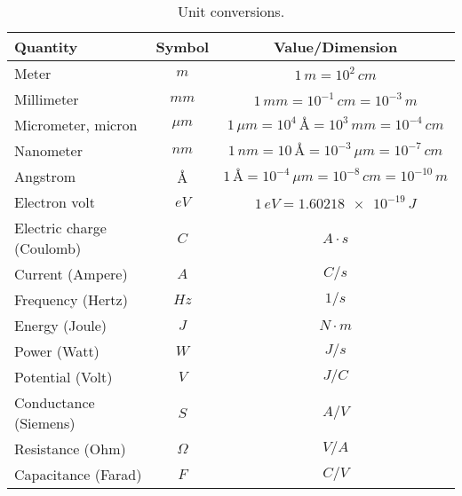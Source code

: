     \begin{table}[H]
        \centering
        \setlength{\tabcolsep}{20pt}
        \renewcommand{\arraystretch}{1.5}
        \begin{tabular}{|l|c|c|}
            \hline
            \textbf{Quantity}  &  \textbf{Symbol} & \textbf{Value/Dimension}\\
            \hline
            Meter & $m$ & $1\,m = 10^2\,cm$\\
            \hline
            Millimeter & $mm$ & $1\,mm = 10^{-1}\,cm = 10^{-3}\,m$\\
            \hline
            Micrometer, micron & $\mu m$ & $1\,\mu m = 10^4\,\text{\AA} = 10^3\,mm = 10^{-4}\,cm$\\
            \hline
            Nanometer & $nm$ & $1\,nm = 10\,\text{\AA} = 10^{-3}\,\mu m = 10^{-7}\,cm$\\
            \hline
            Angstrom & $\text{\AA}$ & $1\,\text{\AA} = 10^{-4}\,\mu m = 10^{-8}\,cm = 10^{-10}\,m$\\
            \hline
            Electron volt & $eV$ & $1\,eV = \num{1.60218e-19}\,J$\\
            \hline
            Electric charge (Coulomb) & $C$ & $A \cdot s$\\
            \hline
            Current (Ampere) & $A$ & $C/s$\\
            \hline
            Frequency (Hertz) & $Hz$ & $1/s$\\
            \hline
            Energy (Joule) & $J$ & $N \cdot m$\\
            \hline
            Power (Watt) & $W$ & $J/s$\\
            \hline
            Potential (Volt) & $V$ & $J/C$\\
            \hline
            Conductance (Siemens) & $S$ & $A/V$\\
            \hline
            Resistance (Ohm) & $\Omega$ & $V/A$\\
            \hline
            Capacitance (Farad) & $F$ & $C/V$\\
            \hline
        \end{tabular}
        \caption{Unit conversions.
        \label{tab:unit_conv}} 
    \end{table}
\newpage